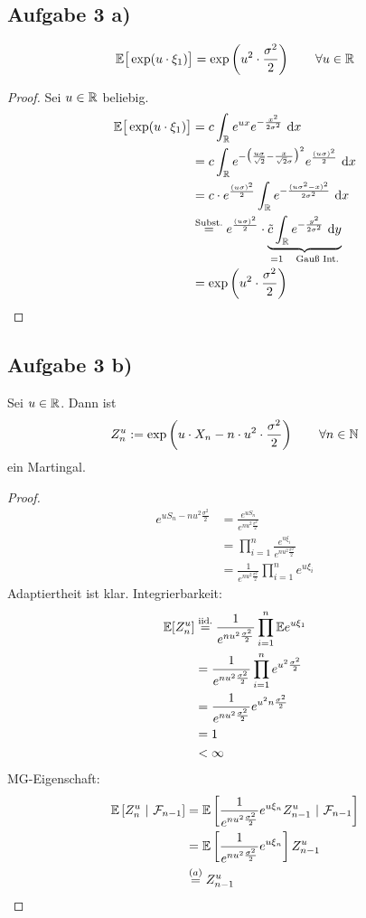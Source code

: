 \documentclass[12pt,a4paper]{article}
\begin{document}
\subsection*{Aufgabe 3 a)}
\begin{align*}
\mathbb{E}\big[\exp(u\cdot\xi_1)\big]=\exp\left(u^2\cdot\frac{\sigma^2}{2}\right)\qquad\forall u\in\mathbb{R}
\end{align*}

\begin{proof}
Sei $u\in\mathbb{R}$ beliebig.
\begin{align*}
\mathbb{E}\big[\exp(u\cdot\xi_1)\big]
&=c\int_{\mathbb{R}} e^{ux} e^{-\frac{x^2}{2\sigma^2}}\text{ d} x\\
&=c\int_{\mathbb{R}} e^{-\big(\frac{u\sigma}{\sqrt{2}}-\frac{x}{\sqrt{2}\sigma}\big)^2} e^{\frac{(u\sigma)^2}{2}}\text{ d} x\\
&=c \cdot e^{\frac{(u\sigma)^2}{2}}\int_{\mathbb{R}} e^{-\frac{(u\sigma^2-x)^2}{2\sigma^2}}\text{ d} x\\
&\stackrel{\text{Subst.}}{=}e^{\frac{(u\sigma)^2}{2}} \cdot \underbrace{\tilde{c} \int_{\mathbb{R}} e^{-\frac{y^2}{2\sigma^2}}\text{ d} y}_{=1 ~~~ \text{Gauß Int.}}\\
&=\exp\left(u^2\cdot\frac{\sigma^2}{2}\right)
\end{align*}
\end{proof}

\subsection*{Aufgabe 3 b)}
Sei $u\in\mathbb{R}$. Dann ist
\begin{align*}
Z_n^u:=\exp\left(u\cdot X_n-n\cdot u^2\cdot\frac{\sigma^2}{2}\right)\qquad\forall n\in\mathbb{N}
\end{align*}
ein Martingal.

\begin{proof}
\begin{align*}
	e^{uS_n - nu^2\frac{\sigma^2}{2}}
	&= \frac{e^{uS_n}}{e^{nu^2\frac{\sigma^2}{2}}} \\
	&=\prod_{i=1}^n \frac{e^{u\xi_i}}{e^{nu^2\frac{\sigma^2}{2}}} \\
	&=\frac{1}{e^{nu^2\frac{\sigma^2}{2}}}\prod_{i=1}^n e^{u\xi_i}
\end{align*}
Adaptiertheit ist klar. Integrierbarkeit:
\begin{align*}
	\mathbb{E}[Z^u_n] 
	&\stackrel{\text{iid.}}{=}\frac{1}{e^{nu^2\frac{\sigma^2}{2}}}\prod_{i=1}^n \mathbb{E} e^{u\xi_1} \\
	&=\frac{1}{e^{nu^2\frac{\sigma^2}{2}}}\prod_{i=1}^n e^{u^2\frac{\sigma^2}{2}} \\
	&=\frac{1}{e^{nu^2\frac{\sigma^2}{2}}} e^{u^2n\frac{\sigma^2}{2}} \\
	&=1 \\
	&<\infty
\end{align*}
MG-Eigenschaft:
\begin{align*}
	\mathbb{E}\left[{Z_n^u}~|~{\mathcal{F}_{n-1}}\right]
	&=\mathbb{E}\left[{\frac{1}{e^{nu^2\frac{\sigma^2}{2}}}e^{u\xi_n}Z^u_{n-1}}~|~{\mathcal{F}_{n-1}}\right]\\
	&=\mathbb{E}\left[\frac{1}{e^{nu^2\frac{\sigma^2}{2}}}e^{u\xi_n}\right]Z^u_{n-1}\\
	&\stackrel{(a)}{=} Z^u_{n-1}
\end{align*}
\end{proof}
\end{document}
